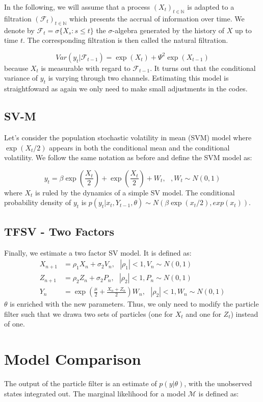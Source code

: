 \documentclass[11pt,a4,twosided,singlespacing,titlepagenumber=on]{scrreprt}
\numberwithin{equation}{chapter} %
\theoremstyle{remark}
\begin{document}
In the following, we will assume that a process $(X_t)_{t \in \mathbb{N}}$ is adapted to a filtration $(\mathcal{F}_t)_{t \in \mathbb{N}}$ which presents the accrual of information over time. We denote by $\mathcal{F}_t = \sigma \{X_s : s \leq t \}$ the $\sigma$-algebra generated by the history of $X$ up to time $t$. The corresponding filtration is then called the natural filtration.

$$Var(y_t | \mathcal{F}_{t-1}) = \exp(X_t) + \Psi^2 \exp(X_{t-1})$$
because $X_t$ is measurable with regard to $\mathcal{F}_{t-1}$. It turns out that the conditional variance of $y_t$ is varying through two channels. Estimating this model is straightfoward as again we only need to make small adjustments in the codes.

\subsection{SV-M}
Let's consider the population stochastic volatility in mean (SVM) model where $\exp(X_t /2)$ appears in both the conditional mean and the conditional volatility. We follow the same notation as before and define the SVM model as: 

$$y_t = \beta \exp\left(\frac{X_t}{2}\right) + \exp\left(\frac{X_t}{2}\right) + W_t, \text{ }, W_t \sim N(0,1)$$
where $X_t$ is ruled by the dynamics of a simple SV model. The conditional probability density of $y_t$ is $p(y_t | x_t, Y_{t-1}, \theta) \sim N(\beta \exp(x_t/2), exp(x_t))$.

\subsection{TFSV - Two Factors}
Finally, we estimate a two factor SV model. It is defined as:
\begin{align*}
  X_{n+1} &=  \rho_1 X_{n} + \sigma_2 V_n, \text{ } |\rho_1| < 1, V_n \sim N(0,1)\\
  Z_{n+1} &=  \rho_2 Z_{n} + \sigma_2 P_n, \text{ } |\rho_2| < 1, P_n \sim N(0,1) \\
  Y_n &=  \exp \left(\frac{\mu}{2} + \frac{X_n+Z_n}{2} \right) W_n, \text{ } |\rho_2| < 1, W_n \sim N(0,1)
\end{align*}
$\theta$ is enriched with the new parameters. Thus, we only need to modify the particle filter such that we drawa two sets of particles (one for $X_t$ and one for $Z_t$) instead of one.

\section{Model Comparison}
The output of the particle filter is an estimate of $p(y|\theta)$, with the unobserved states integrated out. The marginal likelihood for a model $\mathcal{M}$ is defined as:
\end{document}
